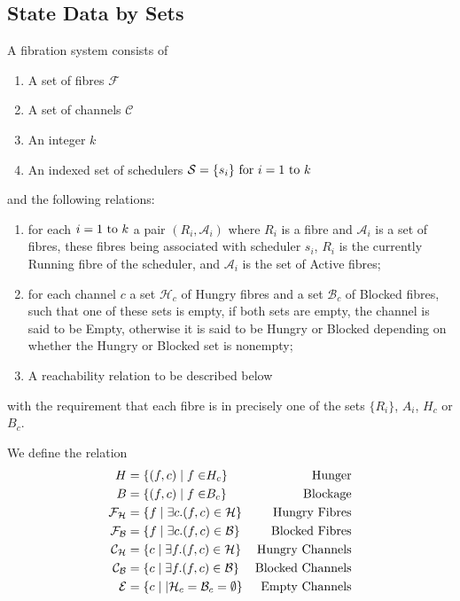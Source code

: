 \documentclass[oneside]{book}
\begin{document}
\subsection{State Data by Sets}
A fibration system consists of 
\begin{enumerate}
\item A set of fibres $\mathcal F$
\item A set of channels $\mathcal C$
\item An integer $k$
\item An indexed set of schedulers $\mathcal S= \{s_i\}{\rm\ for\ }i=1 {\rm\ to\ }k$  
\end{enumerate}
and the following relations:
\begin{enumerate}
\item for each $i=1 {\rm\ to\ }k$ a pair $(R_i, \mathcal A_i)$ where $R_i$ is a fibre
and $\mathcal A_i$ is a set of fibres, these fibres being associated with
scheduler $s_i$, $R_i$ is the currently Running fibre of the scheduler,
and $\mathcal A_i$ is the set of Active fibres;
\item for each channel $c$ a set $\mathcal H_c$ of Hungry fibres
and a set $\mathcal B_c$ of Blocked fibres, such that one of these sets
is empty, if both sets are empty, the channel is said to be Empty,
otherwise it is said to be Hungry or Blocked depending on whether
the Hungry or Blocked set is nonempty;

\item A reachability relation to be described below
\end{enumerate}
with the requirement that each fibre is in precisely one of the sets $\{R_i\}$,
$A_i$, $H_c$ or $B_c$.

We define the relation 
\begin{align}
\mathrel H &= \{(f,c) \mid f \in \mathrel H_c\}&\rm Hunger\\
\mathrel B &= \{(f,c) \mid f \in \mathrel B_c\}&\rm Blockage\\
\mathcal F_{\mathcal H} &= \{f \mid \exists c . (f,c) \in \mathcal H\}&\rm Hungry\ Fibres\\
\mathcal F_{\mathcal B} &= \{f \mid \exists c . (f,c) \in \mathcal B\}&\rm Blocked\ Fibres\\
\mathcal C_{\mathcal H} &= \{ c \mid \exists f . (f,c) \in \mathcal H\}&\rm Hungry\ Channels\\
\mathcal C_{\mathcal B} &= \{ c \mid \exists f . (f,c) \in \mathcal B\}&\rm Blocked\ Channels\\
\mathcal E &= \{c \mid | \mathcal H_c = \mathcal B_c = \emptyset \}&\rm Empty\ Channels
\end{align}
\end{document}
